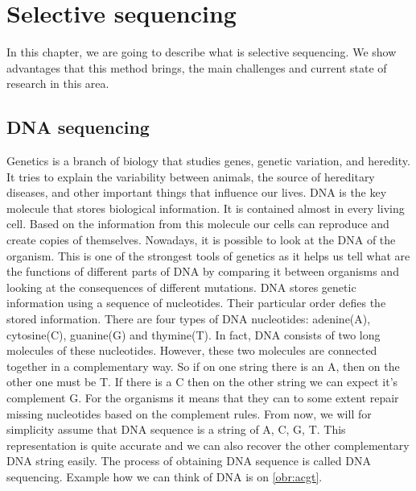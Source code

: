 \chapter{Selective sequencing}

\label{kap:selSeq} %

In this chapter, we are going to describe what is selective sequencing. We
show advantages that this method brings, the main challenges and current state of
research in this area.

\section{DNA sequencing}

Genetics is a branch of biology that studies genes, genetic variation, and heredity.
It tries to explain the variability between animals, the source of hereditary diseases, and
other important things that influence our lives. DNA is the key molecule
that stores biological information. It is contained almost in every living cell. Based
on the information from this molecule our cells can reproduce and create copies of
themselves. Nowadays, it is possible to look at the DNA of the organism. This is
one of the strongest tools of genetics as it helps us tell what are the functions
of different parts of DNA by comparing it between organisms and looking at the
consequences of different mutations. DNA stores genetic information using a sequence of
nucleotides. Their particular order defies the stored information. There are four types of DNA nucleotides:
adenine(A), cytosine(C), guanine(G) and thymine(T). In fact, DNA consists of two long
molecules of these nucleotides. However, these two molecules are connected together
in a complementary way. So if on one string there is an A, then on the other
one must be T. If there is a C then on the other string we can expect
it's complement G. For the organisms it means that they can to some extent repair
missing nucleotides based on the complement rules. From now, we will for simplicity
assume that DNA sequence is a string of A, C, G, T. This representation is quite accurate
and we can also recover the other complementary DNA string easily. The process of obtaining DNA
sequence is called DNA sequencing. Example how we can think of DNA is on \ref{obr:acgt}.



